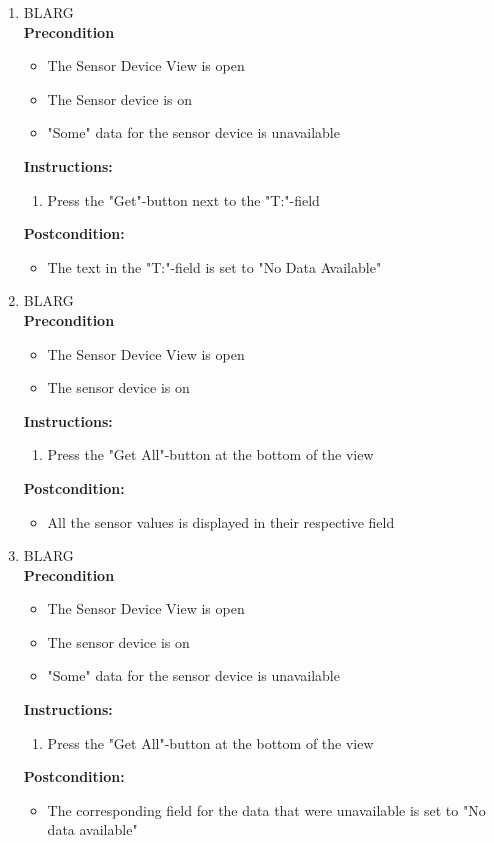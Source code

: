 \documentclass[a4paper]{article}
\newlength{\testlabellength}
\newenvironment{testlist}{\begin{enumerate}[label=\bfseries Instruction \thesubsection.\arabic* , labelindent=0pt, labelwidth=\testlabellength , leftmargin=2cm]}{\end{enumerate}}
\newenvironment{precondition}{
{\color{white}BLARG}\\ 
\textbf{Precondition}
\begin{itemize}[labelindent=0cm, labelwidth=2cm , leftmargin=1cm]
}
{\end{itemize}}
\newenvironment{instruction}{
\textbf{Instructions:}
\begin{enumerate}[label=\bfseries  \arabic*., labelindent=0cm, labelwidth=2cm , leftmargin=1cm]
}
{\end{enumerate}}
\newenvironment{postcondition}{
\textbf{Postcondition:}
\begin{itemize}[labelindent=0cm, labelwidth=2cm , leftmargin=1cm]
}
{\end{itemize}}
\begin{document}
\begin{appendices}
\begin{testlist}
	\item
		\begin{precondition}
		\item The Sensor Device View is open
       \item The Sensor device is on
		\item "Some" data for the sensor device is unavailable
		\end{precondition}
		\begin{instruction}
			\item Press the "Get"-button next to the "T:"-field
		\end{instruction}
		\begin{postcondition}
			\item The text in the "T:"-field is set to "No Data Available"
		\end{postcondition}
        

	\item
		\begin{precondition} 
			\item The Sensor Device View is open
			\item The sensor device is on
		\end{precondition}
		\begin{instruction}
		\item Press the "Get All"-button at the bottom of the view
		\end{instruction}
		\begin{postcondition}
		\item All the sensor values is displayed in their respective field
		\end{postcondition}

		\item
		\begin{precondition}
		\item The Sensor Device View is open
		\item The sensor device is on
        \item "Some" data for the sensor device is unavailable
		\end{precondition}
		\begin{instruction}
		\item Press the "Get All"-button at the bottom of the view
		\end{instruction}
		\begin{postcondition} 
		\item The corresponding field for the data that were unavailable is set to "No data 				available"
		\end{postcondition}


\end{testlist}
\end{appendices}
\end{document}
